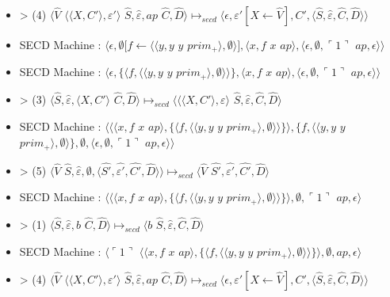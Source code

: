 \documentclass[10pt,a4paper]{article}
\begin{document}
\begin{itemize}
					\item[] > (4) $\langle\widehat{V}$ $\langle\langle X,C'\rangle,\varepsilon'\rangle$ $\widehat{S},\widehat{\varepsilon},ap$ $\widehat{C},\widehat{D}\rangle \longmapsto_{secd} \langle\epsilon,\varepsilon'[X \leftarrow \widehat{V}],C',\langle\widehat{S},\widehat{\varepsilon},\widehat{C},\widehat{D}\rangle\rangle$
					\item[] SECD Machine : $\langle\epsilon,\emptyset[f \leftarrow \langle\langle y,y$ $y$ $prim_{+}\rangle,\emptyset\rangle],\langle x,f$ $x$ $ap\rangle,\langle\epsilon,\emptyset,\ulcorner 1\urcorner$ $ap,\epsilon\rangle\rangle$
					\item[] SECD Machine : $\langle\epsilon,\{\langle f,\langle\langle y,y$ $y$ $prim_{+}\rangle,\emptyset\rangle\rangle\},\langle x,f$ $x$ $ap\rangle,\langle\epsilon,\emptyset,\ulcorner 1\urcorner$ $ap,\epsilon\rangle\rangle$
					\item[] >  (3) $\langle\widehat{S},\widehat{\varepsilon},\langle X,C'\rangle$ $\widehat{C},\widehat{D}\rangle \longmapsto_{secd} \langle\langle\langle X,C'\rangle,\varepsilon\rangle$ $\widehat{S},\widehat{\varepsilon},\widehat{C},\widehat{D}\rangle$
					\item[] SECD Machine : $\langle\langle\langle x,f$ $x$ $ap\rangle,\{\langle f,\langle\langle y,y$ $y$ $prim_{+}\rangle,\emptyset\rangle\rangle\}\rangle,\{f,\langle\langle y,y$ $y$ $prim_{+}\rangle,\emptyset\rangle\},\emptyset,\langle\epsilon,\emptyset,\ulcorner 1\urcorner$ $ap,\epsilon\rangle\rangle$
					\item[] > (5) $\langle\widehat{V}$ $\widehat{S},\widehat{\varepsilon},\emptyset,\langle\widehat{S'},\widehat{\varepsilon'},\widehat{C'},\widehat{D}\rangle\rangle \longmapsto_{secd} \langle \widehat{V}$ $\widehat{S'},\widehat{\varepsilon'},\widehat{C'},\widehat{D}\rangle$
					\item[] SECD Machine : $\langle\langle\langle x,f$ $x$ $ap\rangle,\{\langle f,\langle\langle y,y$ $y$ $prim_{+}\rangle,\emptyset\rangle\rangle\}\rangle,\emptyset,\ulcorner 1\urcorner$ $ap,\epsilon\rangle$
					\item[] >  (1) $\langle\widehat{S},\widehat{\varepsilon},b$ $\widehat{C},\widehat{D}\rangle \longmapsto_{secd} \langle b$ $\widehat{S},\widehat{\varepsilon},\widehat{C},\widehat{D}\rangle$
					\item[] SECD Machine :  $\langle\ulcorner 1\urcorner$ $\langle\langle x,f$ $x$ $ap\rangle,\{\langle f,\langle\langle y,y$ $y$ $prim_{+}\rangle,\emptyset\rangle\rangle\}\rangle,\emptyset,ap,\epsilon\rangle$
					\item[] >  (4) $\langle\widehat{V}$ $\langle\langle X,C'\rangle,\varepsilon'\rangle$ $\widehat{S},\widehat{\varepsilon},ap$ $\widehat{C},\widehat{D}\rangle \longmapsto_{secd} \langle\epsilon,\varepsilon'[X \leftarrow \widehat{V}],C',\langle\widehat{S},\widehat{\varepsilon},\widehat{C},\widehat{D}\rangle\rangle$

\end{itemize}
\end{document}
